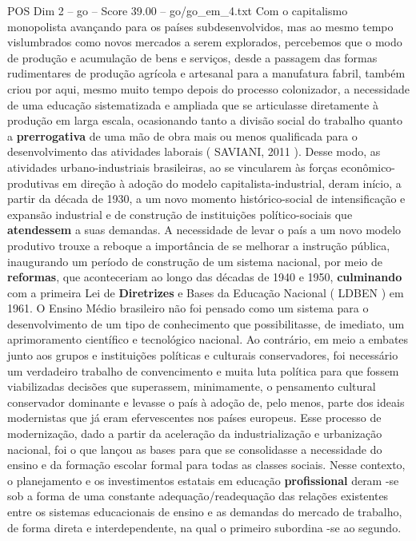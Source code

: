 \begin{textsample}{POS Dim 2 – go – Score 39.00 – go/go\_em\_4.txt}
Com o capitalismo monopolista avançando para os países subdesenvolvidos, mas ao mesmo tempo vislumbrados como novos mercados a serem explorados, percebemos que o modo de produção e acumulação de bens e serviços, desde a passagem das formas rudimentares de produção agrícola e artesanal para a manufatura fabril, também criou por aqui, mesmo muito tempo depois do processo colonizador, a necessidade de uma educação sistematizada e ampliada que se articulasse diretamente à produção em larga escala, ocasionando tanto a divisão social do trabalho quanto a \textbf{prerrogativa} de uma mão de obra mais ou menos qualificada para o desenvolvimento das atividades laborais ( SAVIANI, 2011 ).
Desse modo, as atividades urbano-industriais brasileiras, ao se vincularem às forças econômico-produtivas em direção à adoção do modelo capitalista-industrial, deram início, a partir da década de 1930, a um novo momento histórico-social de intensificação e expansão industrial e de construção de instituições político-sociais que \textbf{atendessem} a suas demandas.
A necessidade de levar o país a um novo modelo produtivo trouxe a reboque a importância de se melhorar a instrução pública, inaugurando um período de construção de um sistema nacional, por meio de \textbf{reformas}, que aconteceriam ao longo das décadas de 1940 e 1950, \textbf{culminando} com a primeira Lei de \textbf{Diretrizes} e Bases da Educação Nacional ( LDBEN ) em 1961.
O Ensino Médio brasileiro não foi pensado como um sistema para o desenvolvimento de um tipo de conhecimento que possibilitasse, de imediato, um aprimoramento científico e tecnológico nacional.
Ao contrário, em meio a embates junto aos grupos e instituições políticas e culturais conservadores, foi necessário um verdadeiro trabalho de convencimento e muita luta política para que fossem viabilizadas decisões que superassem, minimamente, o pensamento cultural conservador dominante e levasse o país à adoção de, pelo menos, parte dos ideais modernistas que já eram efervescentes nos países europeus.
Esse processo de modernização, dado a partir da aceleração da industrialização e urbanização nacional, foi o que lançou as bases para que se consolidasse a necessidade do ensino e da formação escolar formal para todas as classes sociais.
Nesse contexto, o planejamento e os investimentos estatais em educação \textbf{profissional} deram -se sob a forma de uma constante adequação/readequação das relações existentes entre os sistemas educacionais de ensino e as demandas do mercado de trabalho, de forma direta e interdependente, na qual o primeiro subordina -se ao segundo.

\end{textsample}

